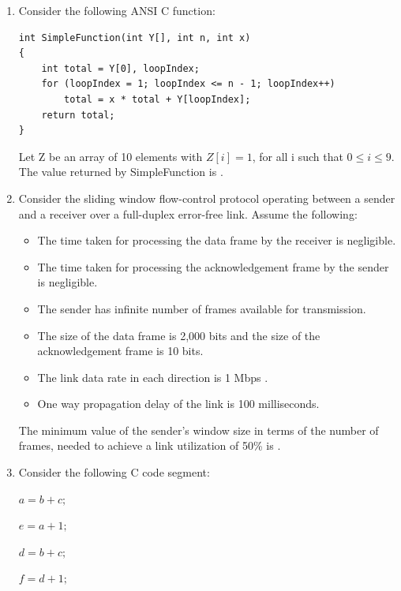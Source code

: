 \documentclass[a4paper, 11pt]{article}
\begin{document}
\begin{enumerate}
    \item Consider the following ANSI C function:
    \begin{verbatim}
int SimpleFunction(int Y[], int n, int x)
{
    int total = Y[0], loopIndex;
    for (loopIndex = 1; loopIndex <= n - 1; loopIndex++)
        total = x * total + Y[loopIndex];
    return total;
}
    \end{verbatim}
    Let Z be an array of 10 elements with $Z[i]=1$, for all i such that $0 \le i \le 9$. The value returned by SimpleFunction  is \underline{\hspace{2cm}}.
    
    \hfill{}
    
    \item Consider the sliding window flow-control protocol operating between a sender and a receiver over a full-duplex error-free link. Assume the following:
    \begin{itemize}
        \item The time taken for processing the data frame by the receiver is negligible.
        \item The time taken for processing the acknowledgement frame by the sender is negligible.
        \item The sender has infinite number of frames available for transmission.
        \item The size of the data frame is 2,000 bits and the size of the acknowledgement frame is 10 bits.
        \item The link data rate in each direction is 1 Mbps .
        \item One way propagation delay of the link is 100 milliseconds.
    \end{itemize}
    The minimum value of the sender's window size in terms of the number of frames,  needed to achieve a link utilization of 50\% is \underline{\hspace{2cm}}.
    
    \hfill{}
    
    \item Consider the following C code segment:
    
    $a = b + c;$
    
    $e = a + 1;$
    
    $d = b + c;$
    
    $f = d + 1;$
    

\end{enumerate}
\end{document}
